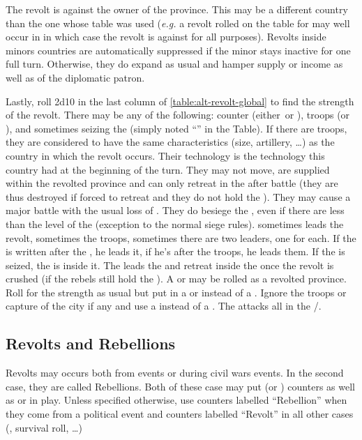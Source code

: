 \aparag The revolt is against the owner of the province. This may be a
different country than the one whose table was used (\emph{e.g.} a
revolt rolled on the table for \FRA may well occur in \SPA in which case
the revolt is against \SPA for all purposes).
\bparag Revolts inside minors countries are automatically suppressed if
the minor stays inactive for one full turn. Otherwise, they do expand as
usual and hamper supply or income as well as \STAB of the diplomatic
patron.

\aparag Lastly, roll 2d10 in the last column of
\ref{table:alt-revolt-global} to find the strength of the revolt.
\bparag There may be any of the following: \REVOLT counter (either\
\facemoins or \Faceplus), troops (\LD or \ARMY\facemoins), \LeaderG and
sometimes seizing the \fortress (simply noted ``\fortress'' in the
Table).
\bparag If there are troops, they are considered to have the same
characteristics (size, artillery, \ldots) as the country in which the
revolt occurs. Their technology is the technology this country had at
the beginning of the turn. They may not move, are supplied within the
revolted province and can only retreat in the \fortress after battle
(they are thus destroyed if forced to retreat and they do not hold the
\fortress). They may cause a major battle with the usual loss of
\STAB. They do besiege the \fortress, even if there are less \LD than
the level of the \fortress (exception to the normal siege rules).
\bparag \LeaderG sometimes leads the revolt, sometimes the troops,
sometimes there are two leaders, one for each. If the \LeaderG is
written after the \REVOLT, he leads it, if he's after the troops, he
leads them.
\bparag If the \fortress is seized, the \LD is inside it. The \LeaderG
leads the \REVOLT and retreat inside the \fortress once the revolt is
crushed (if the rebels still hold the \fortress).
\bparag A \CTZ or \STZ may be rolled as a revolted province. Roll for
the strength as usual but put in a \PIRATE\facemoins or \PIRATE\faceplus
instead of a \REVOLT. Ignore the troops or capture of the city if any
and use a \LeaderA instead of a \LeaderG. The \PIRATE attacks all
\TradeFLEET in the \CTZ/\STZ.

\subsection{Revolts and Rebellions}
\aparag Revolts may occurs both from \RD events or during civil wars
events. In the second case, they are called Rebellions.
\bparag Both of these case may put \REVOLT (or \REBELLION) counters as
well as \ARMY or \LD in play.
\bparag Unless specified otherwise, use counters labelled ``Rebellion''
when they come from a political event and counters labelled ``Revolt''
in all other cases (\RD, \TUR survival roll, \ldots)

